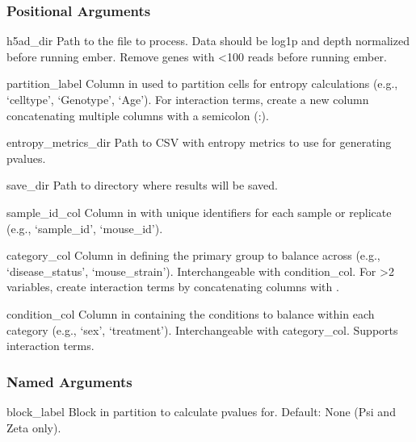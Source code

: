 \documentclass[letterpaper,10pt,english]{sphinxmanual}
\begin{document}
\subsubsection{Positional Arguments}
\label{\detokenize{cli:positional-arguments_repeat1}}\begin{optionlist}{3cm}
\item [h5ad\_dir]  
\sphinxAtStartPar
Path to the  file to process. Data should be log1p and depth normalized before running ember. Remove genes with \textless{}100 reads before running ember.
\item [partition\_label]  
\sphinxAtStartPar
Column in  used to partition cells for entropy calculations (e.g., ‘celltype’, ‘Genotype’, ‘Age’). For interaction terms, create a new column concatenating multiple  columns with a semicolon (:).
\item [entropy\_metrics\_dir]  
\sphinxAtStartPar
Path to CSV with entropy metrics to use for generating p\sphinxhyphen{}values.
\item [save\_dir]  
\sphinxAtStartPar
Path to directory where results will be saved.
\item [sample\_id\_col]  
\sphinxAtStartPar
Column in  with unique identifiers for each sample or replicate (e.g., ‘sample\_id’, ‘mouse\_id’).
\item [category\_col]  
\sphinxAtStartPar
Column in  defining the primary group to balance across (e.g., ‘disease\_status’, ‘mouse\_strain’). Interchangeable with condition\_col. For \textgreater{}2 variables, create interaction terms by concatenating columns with \sphinxtitleref{:}.
\item [condition\_col]  
\sphinxAtStartPar
Column in  containing the conditions to balance within each category (e.g., ‘sex’, ‘treatment’). Interchangeable with category\_col. Supports interaction terms.
\end{optionlist}


\subsubsection{Named Arguments}
\label{\detokenize{cli:named-arguments}}\begin{optionlist}{3cm}
\item [\sphinxhyphen{}\sphinxhyphen{}block\_label]  
\sphinxAtStartPar
Block in partition to calculate p\sphinxhyphen{}values for. Default: None (Psi and Zeta only).
\end{optionlist}
\end{document}
